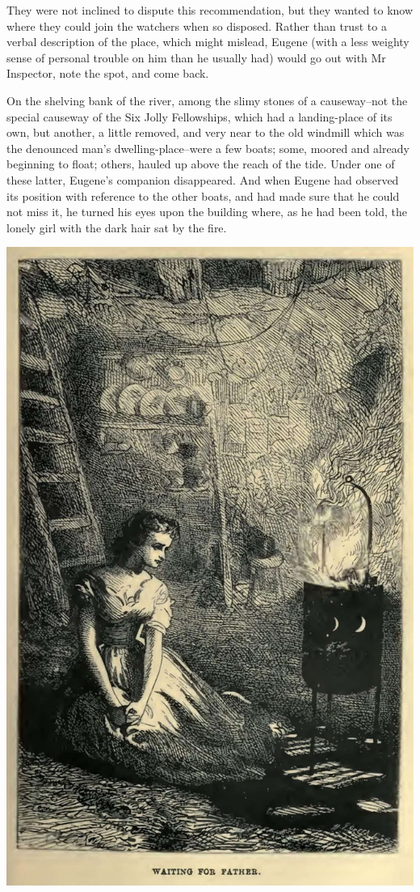 They were not inclined to dispute this recommendation, but they wanted
to know where they could join the watchers when so disposed. Rather than
trust to a verbal description of the place, which might mislead, Eugene
(with a less weighty sense of personal trouble on him than he usually
had) would go out with Mr Inspector, note the spot, and come back.

On the shelving bank of the river, among the slimy stones of a
causeway--not the special causeway of the Six Jolly Fellowships, which
had a landing-place of its own, but another, a little removed, and
very near to the old windmill which was the denounced man’s
dwelling-place--were a few boats; some, moored and already beginning to
float; others, hauled up above the reach of the tide. Under one of these
latter, Eugene’s companion disappeared. And when Eugene had observed its
position with reference to the other boats, and had made sure that he
could not miss it, he turned his eyes upon the building where, as he had
been told, the lonely girl with the dark hair sat by the fire.

\includegraphics[scale=1.9]{01-13-01}

